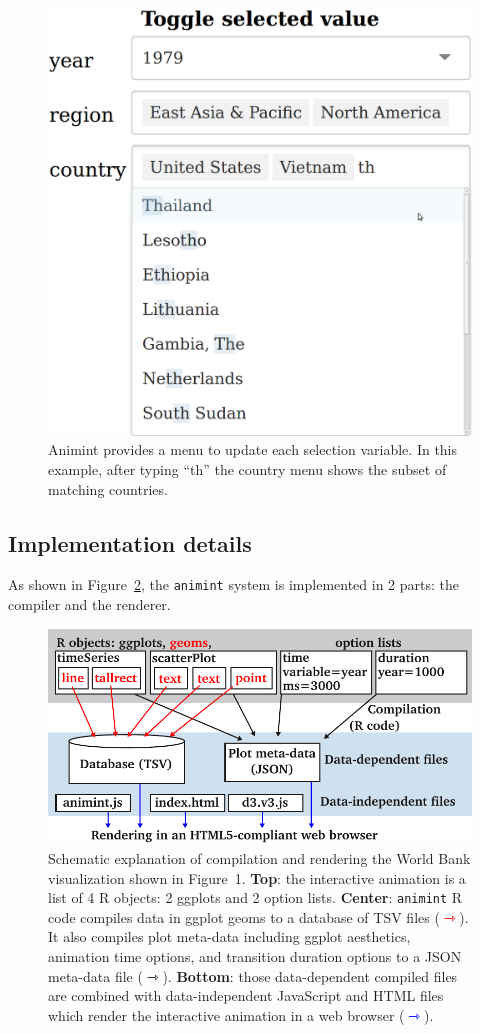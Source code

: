 \documentclass[12pt]{article}\usepackage[]{graphicx}\usepackage[]{color}
\begin{document}
\begin{figure}[b!]
  \centering
  \includegraphics[width=0.5\columnwidth]{Screenshot-toggle-selected-value}
  \caption{Animint provides a menu to update each selection
    variable. In this example, after typing ``th'' the country menu
    shows the subset of matching countries.}
  \label{fig:widgets}
\end{figure}

\subsection{Implementation details}
\label{sec:implementation}

As shown in Figure~\ref{fig:design}, the \texttt{animint} system is implemented
in 2 parts: the compiler and the renderer.

\begin{figure}[b!]
  \centering
  \includegraphics[width=\columnwidth]{figure-design}
  \caption{Schematic explanation of compilation and rendering the
    World Bank visualization shown in Figure~1. \textbf{Top}: the
    interactive animation is a list of 4 R objects: 2 ggplots and 2
    option lists. \textbf{Center}: \texttt{animint} R code compiles data in
    ggplot geoms to a database of TSV files
    (\textcolor{red}{$\rightarrowtriangle$}). It also compiles plot
    meta-data including ggplot aesthetics, animation time
    options, and transition duration options to a JSON meta-data file
    ($\rightarrowtriangle$). \textbf{Bottom}: those data-dependent
    compiled files are combined with data-independent JavaScript and
    HTML files which render the interactive animation in a web browser
    (\textcolor{blue}{$\rightarrowtriangle$}).}
  \label{fig:design}
\end{figure}
\end{document}
